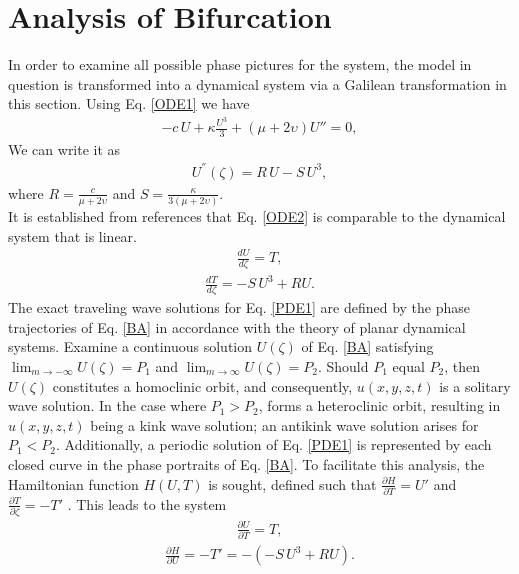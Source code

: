 \documentclass{article}
\numberwithin{equation}{section}
\begin{document}
\section{Analysis of Bifurcation}
In order to examine all possible phase pictures for the system, the model in question is transformed into a dynamical system via a Galilean transformation in this section. Using Eq. \ref{ODE1} we have
\begin{eqnarray}
 -c\,U+\kappa \frac{U^3}{3}+ (\mu+2\upsilon)U''=0,
\end{eqnarray}
We can write it as
\begin{eqnarray}\label{ODE2}
U^{''}{(\zeta)}=R\,U-S\,U^3,
\end{eqnarray}
where $R=\frac{c}{\mu+2\upsilon}$ and $S= \frac{\kappa}{3(\mu+2\upsilon)}$.\\
It is established from references \cite{b44,b45} that Eq. \ref{ODE2} is comparable to the dynamical system that is linear.\\
\begin{eqnarray}\label{BA}
\frac{d U}{d \zeta} = T,\nonumber
\end{eqnarray}
\begin{eqnarray}
\frac{d T}{d \zeta} = -S \,U^{3}+R U.
\end{eqnarray}
The exact traveling wave solutions for Eq. \ref{PDE1} are defined by the phase trajectories of Eq. \ref{BA} in accordance with the theory of planar dynamical systems. Examine a continuous solution $U(\zeta)$ of Eq. \ref{BA} satisfying ${\lim_{m\longrightarrow-\infty}U(\zeta)=P_{1}}$ and ${\lim_{m\longrightarrow\infty}U(\zeta)=P_{2}}$. Should $P_{1}$ equal $P_{2}$, then $U(\zeta)$ constitutes a homoclinic orbit, and consequently, $u(x,y,z, t)$ is a solitary wave solution. In the case where $P_{1} > P_{2}$,  forms a heteroclinic orbit, resulting in $u(x,y,z, t)$ being a kink wave solution; an antikink wave solution arises for  $P_{1} < P_{2}$. Additionally, a periodic solution of Eq. \ref{PDE1} is represented by each closed curve in the phase portraits of Eq. \ref{BA}. To facilitate this analysis, the Hamiltonian function $H(U, T)$ is sought, defined such that $\frac{\partial H}{\partial T} = \mathit{U'}$  and $\frac{\partial T}{\partial \zeta} = -\mathit{T'}$ . This leads to the system
\begin{eqnarray}
\frac{\partial U}{\partial T} = T,\nonumber
\end{eqnarray}
\begin{eqnarray}
\frac{\partial H}{\partial U} =-T'= -(-S \,U^{3}+R U).
\end{eqnarray}
\end{document}
